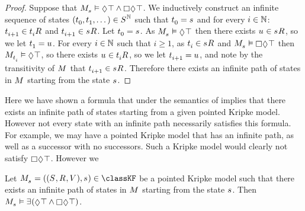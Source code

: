 \begin{proof}
Suppose that $\kPModel{\kStateS} \entails \possible \top \land \necessary \possible \top$.
We inductively construct an infinite sequence of states $(\kStateT_0, \kStateT_1, \dots) \in \kStates^\naturals$ such that $\kStateT_0 = \kStateS$ and for every $i \in \mathbb{N}$: $\kStateT_{i + 1} \in \kSuccessors{}{\kStateT_i}$ and $\kStateT_{i + 1} \in \kSuccessors{}{\kStateS}$.
Let $\kStateT_0 = \kStateS$.
As $\kPModel{\kStateS} \entails \possible \top$ then there exists $\kStateU \in \kSuccessors{}{\kStateS}$, so we let $\kStateT_1 = \kStateU$.
For every $i \in \mathbb{N}$ such that $i \geq 1$, as $\kStateT_i \in \kSuccessors{}{\kStateS}$ and $\kPModel{\kStateS} \entails \necessary \possible \top$ then $\kPModel{\kStateT_i} \entails \possible \top$, so there exists $\kStateU \in \kSuccessors{}{\kStateT_i}$, so we let $\kStateT_{i + 1} = \kStateU$, and note by the transitivity of $\kModel$ that $\kStateT_{i + 1} \in \kSuccessors{}{\kStateS}$.
Therefore there exists an infinite path of states in $\kModel$ starting from the state $\kStateS$.
\end{proof}

Here we have shown a \langMl{} formula that under the semantics of \logicKF{} implies that there exists an infinite path of states starting from a given pointed Kripke model.
However not every state with an infinite path necessarily satisfies this formula.
For example, we may have a pointed Kripke model that has an infinite path, as well as a successor with no successors.
Such a Kripke model would clearly not satisfy $\necessary \possible \top$.
However we 

\begin{lemma}\label{rml-k4-pruning}
Let $\kPModelAndTuple{\kStateS} \in \classKF$ be a pointed Kripke model such that there exists an infinite path of states in $\kModel$ starting from the state $\kStateS$.
Then $\kPModel{\kStateS} \entails \somerefs (\possible \top \land \necessary \possible \top)$.
\end{lemma}

